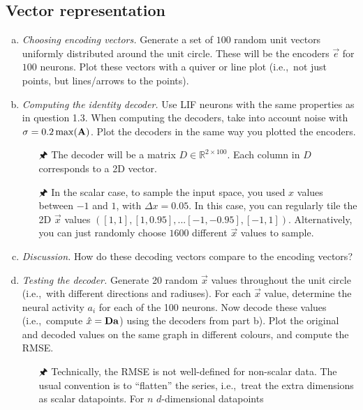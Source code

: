	\subsection{Vector representation}

	\begin{enumerate}[a)]
		\item {} \textit{Choosing encoding vectors.} Generate a set of $100$ random unit vectors uniformly distributed around the unit circle. These will be the encoders $\vec e$ for $100$ neurons. Plot these vectors with a quiver or line plot (i.e.,~not just points, but lines/arrows to the points).
		\item {} \textit{Computing the identity decoder.} Use LIF neurons with the same properties as in question 1.3. When computing the decoders, take into account noise with $\sigma = 0.2\max({\mathbf{A}})$. Plot the decoders in the same way you plotted the encoders.
		\begin{itemize}
			\item[{\symbolfont 🖈}] The decoder will be a matrix $D \in \mathbb{R}^{2 \times 100}$. Each column in $D$ corresponds to a 2D vector.
			\item[{\symbolfont 🖈}]
In the scalar case, to sample the input space, you used $x$ values between $-1$ and $1$, with $\Delta x=0.05$. In this case, you can regularly tile the 2D $\vec x$ values $([1, 1], [1, 0.95], ... [-1, -0.95], [-1, 1])$. Alternatively, you can just randomly choose $1600$ different $\vec x$ values to sample.
		\end{itemize}
		\item {} \textit{Discussion.} How do these decoding vectors compare to the encoding vectors?
		\item {} \textit{Testing the decoder.} Generate 20 random $\vec x$ values throughout the unit circle (i.e.,~with different directions and radiuses). For each $\vec x$ value, determine the neural activity $a_i$ for each of the 100 neurons. Now decode these values (i.e.,~compute $\hat{x} = {\mathbf{D}} {\mathbf{a}}$) using the decoders from part b). Plot the original and decoded values on the same graph in different colours, and compute the RMSE.
		\begin{itemize}
			\item[{\symbolfont 🖈}] Technically, the RMSE is not well-defined for non-scalar data. The usual convention is to \enquote{flatten} the series, i.e.,~treat the extra dimensions as scalar datapoints. For $n$ $d$-dimensional datapoints
			\begin{align*}

\end{align*}
\end{itemize}
\end{enumerate}

